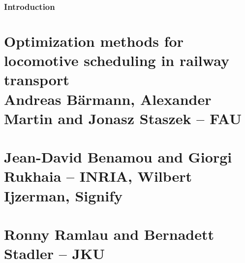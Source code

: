 \documentclass{ROMSOC}
\begin{document}
\newpage
%

\lofoot[\footerlogo \hspace{10pt} \footertext]{\footerlogo \hspace{10pt} \footertext}
\lefoot[\footerlogo \hspace{10pt} \footertext]{\footerlogo \hspace{10pt} \footertext}

\rofoot[\pagemark]{\pagemark}

\rohead{\rightmark}
\rehead{\rightmark}

\newpage
\setcounter{page}{1}
\pagestyle{scrheadings}

\section{Introduction}


\newpage
\part[Optimization methods for locomotive scheduling in railway transport~\\(Andreas Bärmann, Alexander Martin and Jonasz Staszek -- FAU)]{Optimization methods for locomotive scheduling in railway transport\\[0.25\baselineskip]\normalsize Andreas Bärmann, Alexander Martin and Jonasz Staszek -- FAU}


\newpage
\part[~\\(Jean-David Benamou and Giorgi Rukhaia -- INRIA, Wilbert Ijzerman -- Signify)]{\normalsize Jean-David Benamou and Giorgi Rukhaia -- INRIA, Wilbert Ijzerman, Signify}


\clearpage
\part[~\\(Ronny Ramlau and Bernadett Stadler -- JKU)]{\normalsize Ronny Ramlau and Bernadett Stadler -- JKU}

\end{document}
